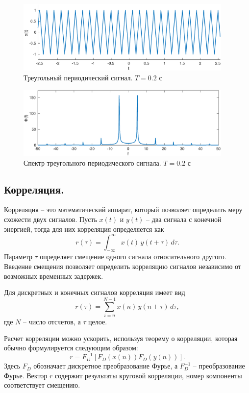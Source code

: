 \documentclass[a4paper,14pt]{extarticle}
\begin{document}
\begin{figure}[H]
\centering
\includegraphics[width=0.95\textwidth]{trg_x.eps}
\caption{Треугольный периодический сигнал. $T = 0.2$ с}
\label{trg_x}
\end{figure}

\begin{figure}[H]
\centering
\includegraphics[width=0.95\textwidth]{trg_s.eps}
\caption{Спектр треугольного периодического сигнала. $T = 0.2$ с}
\label{trg_s}
\end{figure}

\subsection{Корреляция.}

Корреляция -- это математический аппарат, который позволяет определить меру схожести двух сигналов. 
Пусть $x(t)$ и $y(t)$ -- два сигнала с конечной энергией, тогда для них корреляция определяется как 
\begin{equation*}
r(\tau) = \int_{-\infty}^{\infty} x(t)\,y(t+\tau)\,d\tau.
\end{equation*} 
Параметр $\tau$ определяет смещение одного сигнала относительного другого. Введение смещения позволяет определить корреляцию сигналов независимо от возможных временных задержек.

Для дискретных и конечных сигналов корреляция имеет вид 
\begin{equation*}
r(\tau) = \sum_{i=n}^{N-1} x(n)\,y(n+\tau)\,d\tau,
\end{equation*} 
где $N$ -- число отсчетов, а $\tau$ целое.

Расчет корреляции можно ускорить, используя теорему о корреляции, которая обычно формулируется следующим образом:
\begin{equation*}
r = F_D^{-1} [F_D(x(n))F_D(y(n))].
\end{equation*} 
Здесь $F_D$ обозначает дискретное преобразование Фурье, а $F_D^{-1}$ -- преобразование Фурье. Вектор $r$ содержит результаты круговой корреляции, номер компоненты соответствует смещению.
\end{document}
